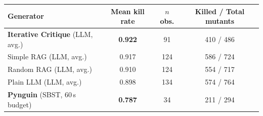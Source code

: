 \begin{tabular}{@{}lccc@{}}
\toprule
Generator & Mean kill rate & $n$ obs. & Killed / Total mutants \\
\midrule
\textbf{Iterative Critique} (LLM, avg.) & \textbf{0.922} & 91 & 410 / 486 \\
Simple RAG (LLM, avg.) & 0.917 & 124 & 586 / 724 \\
Random RAG (LLM, avg.) & 0.910 & 124 & 554 / 717 \\
Plain LLM (LLM, avg.) & 0.898 & 134 & 574 / 764 \\
\textbf{Pynguin} (SBST, 60\,s budget) & \textbf{0.787} & 34 & 211 / 294 \\
\bottomrule
\end{tabular}
